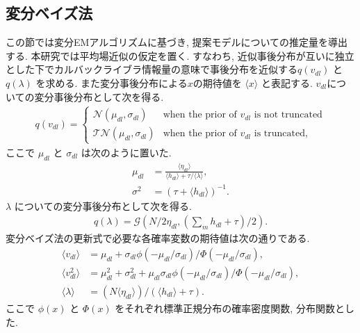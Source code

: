 \documentclass[a4paper,12ptc]{jsarticle} %
\newcommand{\normal}{\mathcal{N}}
\newcommand{\truncnorm}{\mathcal{TN}}
\newcommand{\gam}{\mathcal{G}}
\begin{document}
\subsection{変分ベイズ法}
\label{est_sec}
この節では変分EMアルゴリズム\cite{Jordan}に基づき, 提案モデルについての推定量を導出する. 
本研究では平均場近似の仮定を置く. すなわち, 近似事後分布が互いに独立とした下でカルバックライブラ情報量の意味で事後分布を近似する$q(v_{dl})$ と $q(\lambda)$ を求める. また変分事後分布による$x$の期待値を $\langle x \rangle$ と表記する.
$v_{dl}$についての変分事後分布として次を得る.
\begin{align}
q(v_{dl})= \begin{cases}
\normal(\mu_{dl}, \sigma_{dl}) & \mbox{when the prior of $v_{dl}$ is not truncated} \\
\truncnorm(\mu_{dl}, \sigma_{dl}) & \mbox{when the prior of $v_{dl}$ is truncated},     
\end{cases} \label{qv}
\end{align}
ここで $\mu_{dl}$ と $\sigma_{dl}$ は次のように置いた.
\begin{align*}
\mu_{dl} &=\frac{\langle \eta_{dl} \rangle}{\langle h_{dl}\rangle+\tau/\langle\lambda\rangle},\\
\sigma^2 &=\left(\tau + \langle h_{dl} \rangle \right)^{-1}.
\end{align*}
$\lambda$ についての変分事後分布として次を得る. 
\begin{align}
    q(\lambda) = \gam \left(N/2 \eta_{dl}, \left(\sum_m h_{dl}+\tau\right)/2\right). \label{qlam}
\end{align}
変分ベイズ法の更新式で必要な各確率変数の期待値は次の通りである.
\begin{align*}
\langle v_{dl}\rangle &=\mu_{dl} + \sigma_{dl} \phi(-\mu_{dl}/\sigma_{dl})/\Phi(-\mu_{dl}/\sigma_{dl}),\\
\langle v_{dl}^2 \rangle&=\mu_{dl}^2 + \sigma_{dl}^2 + \mu_{dl} \sigma_{dl} \phi(-\mu_{dl}/\sigma_{dl})/\Phi(-\mu_{dl}/\sigma_{dl}),\\
\langle \lambda \rangle &= (N \langle \eta_{dl} \rangle ) / \left( \langle h_{dl} \rangle +\tau\right).
\end{align*}
ここで $\phi(x)$ と $\Phi(x)$ をそれぞれ標準正規分布の確率密度関数, 分布関数とした.
\end{document}

